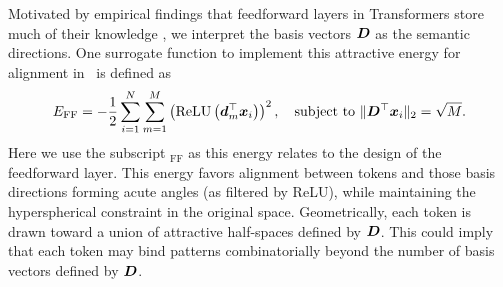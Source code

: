 Motivated by empirical findings that feedforward layers in Transformers store much of their knowledge \citep{geva-etal-2021-transformer, dar-etal-2023-analyzing}, we interpret the basis vectors ${\bm{D}}$ as the semantic directions. One surrogate function to implement this attractive energy for alignment in~ is defined as 
\begin{equation}
\label{eq:4}
    E_{\text{FF}} =  -\frac{1}{2}\sum_{i=1}^N\sum_{m=1}^M\left(\operatorname{ReLU}\left({\bm{d}}_m^\top{\bm{x}}_i\right)\right)^2,\quad \text{subject to} ~\|{\bm{D}}^\top{\bm{x}}_i\|_2 = \sqrt{M}.
\end{equation}
Here we use the subscript $_\mathrm{FF}$ as this energy relates to the design of the feedforward layer. This energy favors alignment between tokens and those basis directions forming acute angles (as filtered by ReLU), while maintaining the hyperspherical constraint in the original space. Geometrically, each token is drawn toward a union of attractive half-spaces defined by ${\bm{D}}$. This could imply that each token may bind patterns combinatorially beyond the number of basis vectors defined by ${\bm{D}}$.

